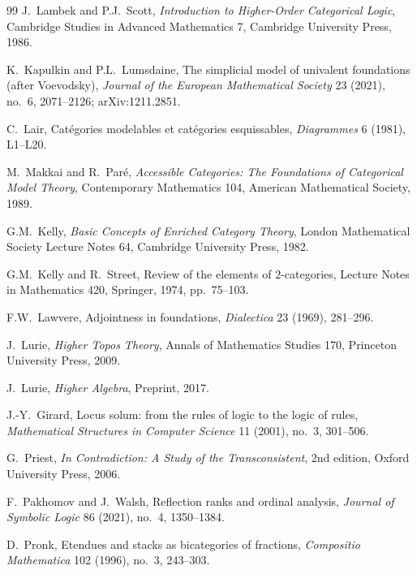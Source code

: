 \documentclass[11pt]{article}
\theoremstyle{plain}
\theoremstyle{definition}
\begin{document}
\begin{thebibliography}{99}
J.~Lambek and P.J.~Scott,
\newblock \emph{Introduction to Higher-Order Categorical Logic},
\newblock Cambridge Studies in Advanced Mathematics 7, Cambridge University Press, 1986.

K.~Kapulkin and P.L.~Lumsdaine,
\newblock The simplicial model of univalent foundations (after Voevodsky),
\newblock \emph{Journal of the European Mathematical Society} 23 (2021), no.~6, 2071--2126; arXiv:1211.2851.

C.~Lair,
\newblock Cat\'egories modelables et cat\'egories esquissables,
\newblock \emph{Diagrammes} 6 (1981), L1--L20.

M.~Makkai and R.~Par\'e,
\newblock \emph{Accessible Categories: The Foundations of Categorical Model Theory},
\newblock Contemporary Mathematics 104, American Mathematical Society, 1989.

G.M.~Kelly,
\newblock \emph{Basic Concepts of Enriched Category Theory},
\newblock London Mathematical Society Lecture Notes 64, Cambridge University Press, 1982.

G.M.~Kelly and R.~Street,
\newblock Review of the elements of $2$-categories,
\newblock Lecture Notes in Mathematics 420, Springer, 1974, pp.~75--103.

F.W.~Lawvere,
\newblock Adjointness in foundations,
\newblock \emph{Dialectica} 23 (1969), 281--296.

J.~Lurie,
\newblock \emph{Higher Topos Theory},
\newblock Annals of Mathematics Studies 170, Princeton University Press, 2009.

J.~Lurie,
\newblock \emph{Higher Algebra},
\newblock Preprint, 2017.

J.-Y.~Girard,
\newblock Locus solum: from the rules of logic to the logic of rules,
\newblock \emph{Mathematical Structures in Computer Science} 11 (2001), no.~3, 301--506.

G.~Priest,
\newblock \emph{In Contradiction: A Study of the Transconsistent},
\newblock 2nd edition, Oxford University Press, 2006.

F.~Pakhomov and J.~Walsh,
\newblock Reflection ranks and ordinal analysis,
\newblock \emph{Journal of Symbolic Logic} 86 (2021), no.~4, 1350--1384.

D.~Pronk,
\newblock Etendues and stacks as bicategories of fractions,
\newblock \emph{Compositio Mathematica} 102 (1996), no.~3, 243--303.


\end{thebibliography}
\end{document}
